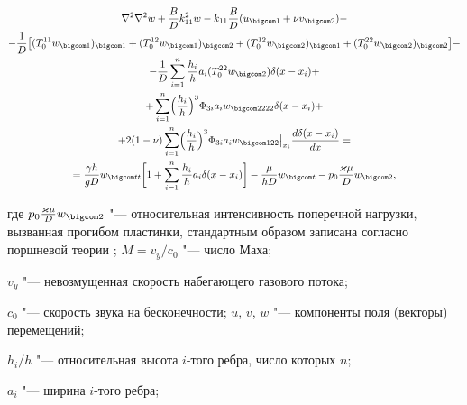 \begin{multline}\label{bel_eq1}

\nabla^2\nabla^2 w+\frac{B}{D}k^2_{11}w-k_{11}\frac{B}{D} ( u_{\bigcom 1}+\nu v_{\bigcom 2})- 

\\

- \frac{1}{D} \bigl[ 

( T^{11}_0 w_{\bigcom 1})_{\bigcom 1}+

( T^{12}_0 w_{\bigcom 1})_{\bigcom 2}+  

(T^{12}_0 w_{\bigcom 2})_{\bigcom 1}+ 

(T^{22}_0 w_{\bigcom 2})_{\bigcom 2}\bigr]-

\\

-

\frac{1}{D}\sum_{i=1}^n\frac{h_i}{h}a_i

(T^{22}_0 w_{\bigcom 2})\delta(x-x_i)+ 

\\

+\sum_{i=1}^n \Bigl( \frac{h_i}{h}\Bigr)^3 \Phi_{3i}a_iw_{\bigcom 2222}\delta(x-x_i)+

\\

+

2(1-\nu)\sum_{i=1}^n\Bigl( \frac{h_i}{h}\Bigr)^3 \Phi_{3i}a_iw_{\bigcom 122}\bigr|_{x_i}\frac{d\delta(x-x_i)}{dx}= \\

=\frac{\gamma h}{g D}w_{\bigcom tt}\biggl[ 1+\sum_{i=1}^n \frac{h_i}{h}a_i\delta(x-x_i)\biggr] 

-\frac{\mu} {h D}w_{\bigcom t}-p_0\frac{\varkappa \mu}{D}w_{\bigcom 2}, 

\end{multline}

где $p_0\frac{\varkappa \mu}{D}w_{\bigcom 2}$ "---  относительная интенсивность поперечной нагрузки, вызванная прогибом пластинки, стандартным образом записана согласно поршневой теории \cite{myl-bib:1,myl-bib:22, myl-bib:30}; $M={v_y}/{c_0}$ "--- число Маха; 

$v_y$ "--- невозмущенная скорость набегающего газового потока; 

$c_0$ "--- скорость звука на бесконечности; $u$, $v$, $w$ "---  компоненты поля (векторы) перемещений; 

${h_i}/{h}$ "--- относительная высота $i$-того ребра, число которых $n$; 

$a_i$ "--- ширина $i$-того ребра; 

